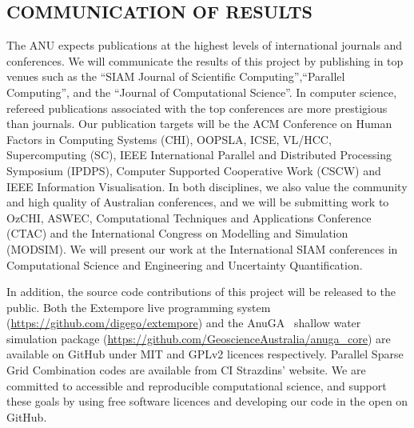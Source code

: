 \subsection*{COMMUNICATION OF RESULTS}

The ANU expects publications at the highest levels of international
journals and conferences. We will communicate the results of this
project by publishing in top venues such as the ``SIAM Journal of
Scientific Computing'',``Parallel Computing'', and the ``Journal of
Computational Science''. In computer science, refereed publications
associated with the top conferences are more prestigious than
journals. Our publication targets will be the ACM Conference on Human
Factors in Computing Systems (CHI), OOPSLA, ICSE, VL/HCC,
Supercomputing (SC), IEEE International Parallel and Distributed
Processing Symposium (IPDPS), Computer Supported Cooperative Work
(CSCW) and IEEE Information Visualisation. In both disciplines, we
also value the community and high quality of Australian conferences,
and we will be submitting work to OzCHI, ASWEC, Computational
Techniques and Applications Conference (CTAC) and the International 
Congress on Modelling and Simulation (MODSIM). We will present 
our work at the International SIAM conferences in Computational Science and Engineering and Uncertainty Quantification. 


In addition, the source code contributions of this project will be
released to the public. Both the Extempore live programming system
(\url{https://github.com/digego/extempore}) and the
 AnuGA~\parencite{anugamanual,nielsen2005hydrodynamic} 
shallow
water simulation package
(\url{https://github.com/GeoscienceAustralia/anuga_core}) are
available on GitHub under MIT and GPLv2 licences respectively.
Parallel Sparse Grid Combination codes are available from CI
Strazdins' website.  We are committed to accessible and reproducible
computational science, and support these goals by using free software
licences and developing our code in the open on GitHub.

